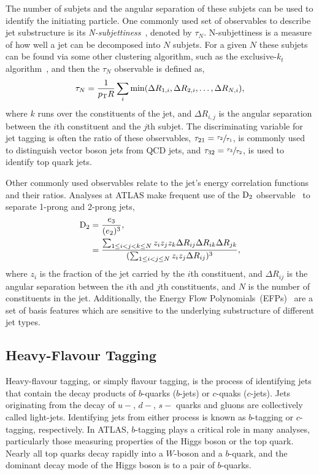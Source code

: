 The number of subjets and the angular separation of these subjets can be used to identify the initiating particle.
One commonly used set of observables to describe jet substructure is its \emph{N-subjettiness}~\cite{Subjet}, denoted by ${\tau_N}$.
N-subjettiness is a measure of how well a jet can be decomposed into $N$ subjets.
For a given $N$ these subjets can be found via some other clustering algorithm, such as the exclusive-$k_t$ algorithm~\cite{ExclusiveKT}, and then the $\tau_N$ observable is defined as,
\begin{equation}
    \tau_N = \frac{1}{p_\mathrm{T} R} \sum_{i} \min(\Delta R_{1,i}, \Delta R_{2,i}, \ldots, \Delta R_{N,i}),
\end{equation}
where $k$ runs over the constituents of the jet, and $\Delta R_{i,j}$ is the angular separation between the $i$th constituent and the $j$th subjet.
The discriminating variable for jet tagging is often the ratio of these observables, $\tau_{21} = \sfrac{\tau_2}{\tau_1}$, is commonly used to distinguish vector boson jets from QCD jets, and
$\tau_{32} = \sfrac{\tau_3}{\tau_2}$, is used to identify top quark jets.

Other commonly used observables relate to the jet's energy correlation functions~\cite{ECF} and their ratios.
Analyses at ATLAS make frequent use of the $\text{D}_2$ observable~\cite{ATLASD2} to separate 1-prong and 2-prong jets,
\begin{align}
    \text{D}_2 & = \frac{e_3}{(e_2)^3}, \\
          & = \frac{
        \sum_{1 \leq i < j < k \leq N} z_i z_j z_k \Delta R_{ij} \Delta R_{ik} \Delta R_{jk}
    }{
        (\sum_{1 \leq i < j \leq N} z_i z_j \Delta R_{ij})^3
    },
\end{align}
where $z_i$ is the \pt fraction of the jet carried by the $i$th constituent, and $\Delta R_{ij}$ is the angular separation between the $i$th and $j$th constituents, and $N$ is the number of constituents in the jet.
Additionally, the Energy Flow Polynomials~(EFPs)~\cite{EFP} are a set of basis features which are sensitive to the underlying substructure of different jet types.

\subsection{Heavy-Flavour Tagging}
\label{sec:flavour_tagging}

Heavy-flavour tagging, or simply flavour tagging, is the process of identifying jets that contain the decay products of $b$-quarks ($b$-jets) or  $c$-quaks ($c$-jets).
Jets originating from the decay of $u-$, $d-$, $s-$ quarks and gluons are collectively called light-jets.
Identifying jets from either process is known as $b$-tagging or $c$-tagging, respectively.
In ATLAS, $b$-tagging plays a critical role in many analyses, particularly those measuring properties of the Higgs boson or the top quark.
Nearly all top quarks decay rapidly into a $W$-boson and a $b$-quark, and the dominant decay mode of the Higgs boson is to a pair of $b$-quarks.

